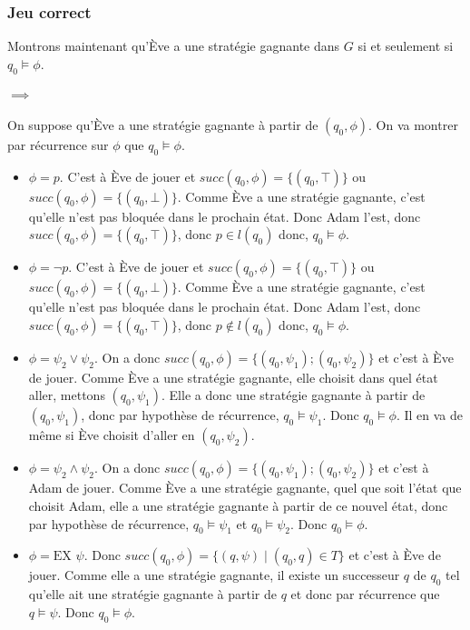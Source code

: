 \documentclass[10pt,a4paper]{article}
\begin{document}
\subsubsection{Jeu correct}
Montrons maintenant qu'Ève a une stratégie gagnante dans $G$ si et seulement si $q_0 \vDash \phi$.

\paragraph{$\implies$}
On suppose qu'Ève a une stratégie gagnante à partir de $(q_0, \phi)$. On va montrer par récurrence sur $\phi$ que $q_0 \vDash \phi$.

\begin{itemize}
\item $\phi = p$. C'est à Ève de jouer et $succ(q_0,\phi) = \{(q_0, \top)\}$ ou $succ(q_0,\phi) = \{(q_0, \bot)\}$. Comme Ève a une stratégie gagnante, c'est qu'elle n'est pas bloquée dans le prochain état. Donc Adam l'est, donc $succ(q_0,\phi) = \{(q_0, \top)\}$, donc $p \in l(q_0)$ donc, $q_0 \vDash \phi$.

\item $\phi = \neg p$. C'est à Ève de jouer et $succ(q_0,\phi) = \{(q_0, \top)\}$ ou $succ(q_0,\phi) = \{(q_0, \bot)\}$. Comme Ève a une stratégie gagnante, c'est qu'elle n'est pas bloquée dans le prochain état. Donc Adam l'est, donc $succ(q_0,\phi) = \{(q_0, \top)\}$, donc $p \notin l(q_0)$ donc, $q_0 \vDash \phi$.

\item $\phi = \psi_2 \lor \psi_2$. On a donc $succ(q_0,\phi) = \{(q_0, \psi_1); (q_0, \psi_2) \}$ et c'est à Ève de jouer. Comme Ève a une stratégie gagnante, elle choisit dans quel état aller, mettons $(q_0, \psi_1)$. Elle a donc une stratégie gagnante à partir de $(q_0, \psi_1)$, donc par hypothèse de récurrence, $q_0 \vDash \psi_1$. Donc $q_0 \vDash \phi$. Il en va de même si Ève choisit d'aller en $(q_0, \psi_2)$.

\item $\phi = \psi_2 \land \psi_2$. On a donc $succ(q_0,\phi) = \{(q_0, \psi_1); (q_0, \psi_2) \}$ et c'est à Adam de jouer. Comme Ève a une stratégie gagnante, quel que soit l'état que choisit Adam, elle a une stratégie gagnante à partir de ce nouvel état, donc par hypothèse de récurrence, $q_0 \vDash \psi_1$ et $q_0 \vDash \psi_2$. Donc $q_0 \vDash \phi$.

\item $\phi = \mbox{EX } \psi$. Donc $succ(q_0, \phi) = \{ (q, \psi) \mid (q_0,q) \in T \} $ et c'est à Ève de jouer. Comme elle a une stratégie gagnante, il existe un successeur $q$ de $q_0$ tel qu'elle ait une stratégie gagnante à partir de $q$ et donc par récurrence que $q \vDash \psi$. Donc $q_0 \vDash \phi$.


\end{itemize}
\end{document}
